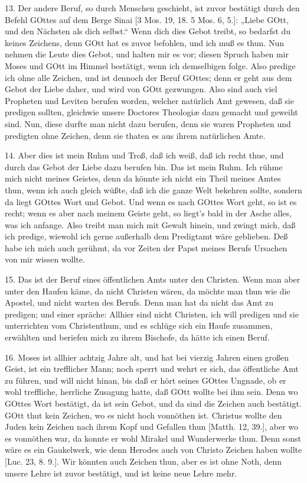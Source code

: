 13. Der andere Beruf, so durch Menschen geschieht, ist zuvor bestätigt durch den Befehl GOttes auf dem Berge Sinai [3 Mos. 19, 18. 5 Mos. 6, 5.]: „Liebe GOtt, und den Nächsten als dich selbst.“ Wenn dich dies Gebot treibt, so bedarfst du keines Zeichens, denn GOtt hat es zuvor befohlen, und ich muß es thun. Nun nehmen die Leute dies Gebot, und halten mir es vor; diesen Spruch haben mir Moses und GOtt im Himmel bestätigt, wenn ich demselbigen folge. Also predige ich ohne alle Zeichen, und ist dennoch der Beruf GOttes; denn er geht aus dem Gebot der Liebe daher, und wird von GOtt gezwungen. Also sind auch viel Propheten und Leviten berufen worden, welcher natürlich Amt gewesen, daß sie predigen sollten, gleichwie unsere Doctores Theologiæ dazu gemacht und geweiht sind. Nun, diese durfte man nicht dazu berufen, denn sie waren Propheten und predigten ohne Zeichen, denn sie thaten es aus ihrem natürlichen Amte.

14. Aber dies ist mein Ruhm und Troß, daß ich weiß, daß ich recht thue, und durch das Gebot der Liebe dazu berufen bin. Das ist mein Ruhm. Ich rühme mich nicht meines Geistes, denn da könnte ich nicht ein Theil meines Amtes thun, wenn ich auch gleich wüßte, daß ich die ganze Welt bekehren sollte, sondern da liegt GOttes Wort und Gebot. Und wenn es nach GOttes Wort geht, so ist es recht; wenn es aber nach meinem Geiste geht, so liegt’s bald in der Asche alles, was ich anfange. Also treibt man mich mit Gewalt hinein, und zwingt mich, daß ich predige, wiewohl ich gerne außerhalb dem Predigtamt wäre geblieben. Deß habe ich mich auch gerühmt, da vor Zeiten der Papst meines Berufs Ursachen von mir wissen wollte.

15. Das ist der Beruf eines öffentlichen Amts unter den Christen. Wenn man aber unter den Haufen käme, da nicht Christen wären, da möchte man thun wie die Apostel, und nicht warten des Berufs. Denn man hat da nicht das Amt zu predigen; und einer spräche: Allhier sind nicht Christen, ich will predigen und sie unterrichten vom Christenthum, und es schlüge sich ein Haufe zusammen, erwählten und beriefen mich zu ihrem Bischofe, da hätte ich einen Beruf.

16. Moses ist allhier achtzig Jahre alt, und hat bei vierzig Jahren einen großen Geist, ist ein trefflicher Mann; noch sperrt und wehrt er sich, das öffentliche Amt zu führen, und will nicht hinan, bis daß er hört seines GOttes Ungnade, ob er wohl treffliche, herrliche Zusagung hatte, daß GOtt wollte bei ihm sein. Denn wo GOttes Wort bestätigt, da ist sein Gebot, und da sind die Zeichen auch bestätigt. GOtt thut kein Zeichen, wo es nicht hoch vonnöthen ist. Christus wollte den Juden kein Zeichen nach ihrem Kopf und Gefallen thun [Matth. 12, 39.], aber wo es vonnöthen war, da konnte er wohl Mirakel und Wunderwerke thun. Denn sonst wäre es ein Gaukelwerk, wie denn Herodes auch von Christo Zeichen haben wollte [Luc. 23, 8. 9.]. Wir könnten auch Zeichen thun, aber es ist ohne Noth, denn unsere Lehre ist zuvor bestätigt, und ist keine neue Lehre mehr.

